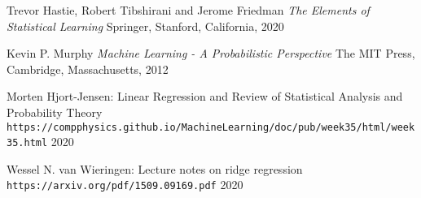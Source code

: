 \documentclass{article}
\begin{document}
\clearpage

\begin{thebibliography}{3}
Trevor Hastie, Robert Tibshirani and Jerome Friedman
\textit{The Elements of Statistical Learning}
Springer, Stanford, California, 2020

Kevin P. Murphy
\textit{Machine Learning - A Probabilistic Perspective}
The MIT Press, Cambridge, Massachusetts, 2012

Morten Hjort-Jensen: Linear Regression and Review of Statistical Analysis and Probability Theory 
\\\texttt{https://compphysics.github.io/MachineLearning/doc/pub/week35/html/week35.html}
2020

Wessel N. van Wieringen: Lecture notes on ridge regression
\\\texttt{https://arxiv.org/pdf/1509.09169.pdf}
2020

\end{thebibliography}
\end{document}
